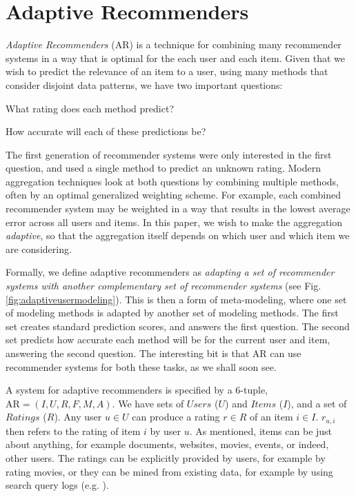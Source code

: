 \section{Adaptive Recommenders}
\label{sec:adaptive}

\emph{Adaptive Recommenders} (AR) is a technique for combining many recommender systems
in a way that is optimal for the each user and each item.
Given that we wish to predict the relevance of an item to a user,
using many methods that consider disjoint data patterns,
we have two important questions:

\begin{enumerate*}
  \item What rating does each method predict?
  \item How accurate will each of these predictions be?
\end{enumerate*}

The first generation of recommender systems were only interested in the first question,
and used a single method to predict an unknown rating.
Modern aggregation techniques look at both questions by combining multiple methods,
often by an optimal generalized weighting scheme.
For example, each combined recommender system may be weighted in a way that results in the 
lowest average error across all users and items.
In this paper, we wish to make the aggregation \emph{adaptive},
so that the aggregation itself depends on which user and which item we are considering.

Formally, we define adaptive recommenders as \emph{adapting a set of recommender systems
with another complementary set of recommender systems} 
(see Fig. \ref{fig:adaptiveusermodeling}).
This is then a form of meta-modeling, where one set of modeling methods
is adapted by another set of modeling methods.
The first set creates standard prediction scores, and answers the first question.
The second set predicts how accurate each method will be for the current user and item,
answering the second question.
The interesting bit is that AR can use recommender systems for both these tasks, as we shall soon see.

A system for adaptive recommenders is specified by a 6-tuple, 
$\mathrm{AR} = (I,U,R,F,M,A)$.
We have sets of $Users$ ($U$) and $Items$ ($I$), 
and a set of $Ratings$ ($R$).
Any user $u \in U$ can produce a rating $r \in R$ of an item $i \in I$.
$r_{u,i}$ then refers to the rating of item $i$ by user $u$.
As mentioned, items can be just about anything, for example documents, websites, movies, events, or indeed, other users.
The ratings can be explicitly provided by users, for example by rating movies,
or they can be mined from existing data, for example by using search query logs
(e.g. \cite{Liu2002, Sugiyama2004, Shen2005, Speretta2000}).

